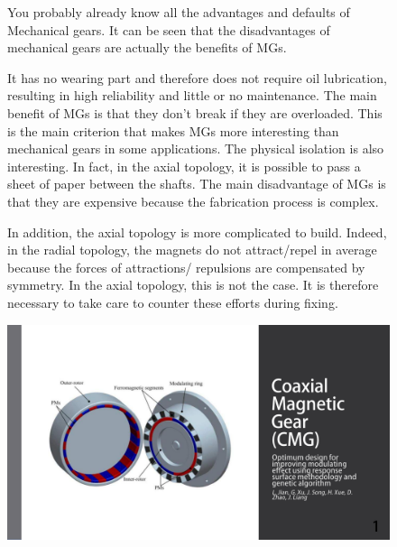 \begin{figure}[H]
    \begin{minipage}{.45\linewidth}
        
        You probably already know all the advantages and defaults of Mechanical gears.
        It can be seen that the disadvantages of mechanical gears are actually the benefits of MGs.
        
        It has no wearing part and therefore does not require oil lubrication, resulting in high reliability and little or no maintenance. The main benefit of MGs is that they don’t break if they are overloaded. This is the main criterion that makes MGs more interesting than mechanical gears in some applications. The physical isolation is also interesting. In fact, in the axial topology, it is possible to pass a sheet of paper between the shafts. 
        The main disadvantage of MGs is that they are expensive because the fabrication process is complex. 
        
        In addition, the axial topology is more complicated to build. Indeed, in the radial topology, the magnets do not attract/repel in average because the forces of attractions/ repulsions are compensated by symmetry. In the axial topology, this is not the case. It is therefore necessary to take care to counter these efforts during fixing.

    \end{minipage}
    \hfill%
    \begin{minipage}[c]{.45\linewidth}
        \centering
        \includegraphics[page={7},width=\textwidth]{LELEC2311.allow.pdf}
    
    \end{minipage}
\end{figure}

